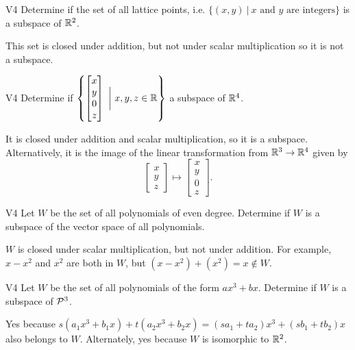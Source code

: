 \begin{problem}{V4}
Determine if the set of all lattice points, i.e. $\{(x,y)\ \big|\ \text{$x$ and $y$ are integers} \}$ is a subspace of $\IR^2$.
\end{problem}
\begin{solution}
This set is closed under addition, but not under scalar multiplication so it is not a subspace.
\end{solution}

\begin{problem}{V4}
Determine if $\left\{ \begin{bmatrix} x \\ y \\ 0 \\ z \end{bmatrix}\  \bigg|\ x,y,z \in \IR\right\}$  a subspace of $\IR^4$.
\end{problem}
\begin{solution}
It is closed under addition and scalar multiplication, so it is a subspace.  Alternatively, it is the image of the linear transformation from $\IR^3 \rightarrow \IR^4$ given by $$\begin{bmatrix} x \\ y \\ z \end{bmatrix} \mapsto  \begin{bmatrix} x \\ y \\ 0 \\ z \end{bmatrix}.$$
\end{solution}


\begin{problem}{V4} Let $W$ be the set of all polynomials of even degree.  Determine if $W$ is a subspace of the vector space of all polynomials.
\end{problem}
\begin{solution}
$W$ is closed under scalar multiplication, but not under addition.  For example, $x-x^2$ and $x^2$ are both in $W$, but $(x-x^2)+(x^2)=x \notin W$.
\end{solution}


\begin{problem}{V4} Let $W$ be the set of all polynomials of the form
\(ax^3+bx\).  Determine if $W$ is a subspace of \(\P^3\).
\end{problem}
\begin{solution}
Yes because \(s(a_1x^3+b_1x)+t(a_2x^3+b_2x)=
(sa_1+ta_2)x^3+(sb_1+tb_2)x\) also belongs to \(W\).
Alternately, yes because \(W\) is isomorphic to \(\IR^2\).
\end{solution}


